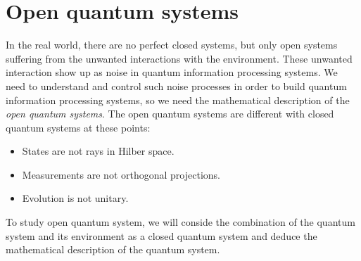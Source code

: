 \documentclass{article}
\begin{document}
\section{Open quantum systems}
In the real world, there are no perfect closed systems, but only open systems suffering from the unwanted interactions with the environment. These unwanted interaction show up as noise in quantum information processing systems. We need to understand and control such noise processes in order to build quantum information processing systems, so we need the mathematical description of the \textit{open quantum systems}. 
The open quantum systems are different with closed quantum systems at these points:
\begin{itemize}
	\item States are not rays in Hilber space.
	
	\item Measurements are not orthogonal projections.
	
	\item Evolution is not unitary.
\end{itemize}
To study open quantum system, we will conside the combination of the quantum system and its environment as a closed quantum system and deduce the mathematical description of the quantum system.
\end{document}
